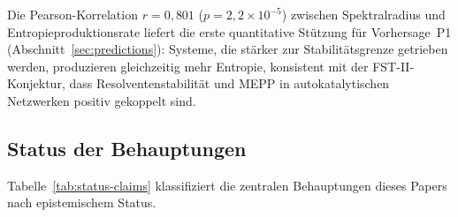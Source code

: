 \documentclass[12pt,a4paper]{article}
\theoremstyle{remark}
\begin{document}
Die Pearson-Korrelation $r = 0{,}801$ ($p = 2{,}2 \times 10^{-5}$) zwischen Spektralradius und Entropieproduktionsrate liefert die erste quantitative St\"utzung f\"ur Vorhersage~P1 (Abschnitt~\ref{sec:predictions}): Systeme, die st\"arker zur Stabilit\"atsgrenze getrieben werden, produzieren gleichzeitig mehr Entropie, konsistent mit der FST-II-Konjektur, dass Resolventenstabilit\"at und MEPP in autokatalytischen Netzwerken positiv gekoppelt sind.

\subsection{Status der Behauptungen}

Tabelle~\ref{tab:status-claims} klassifiziert die zentralen Behauptungen dieses Papers nach epistemischem Status.
\end{document}
